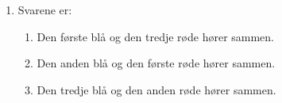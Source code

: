 \begin{enumerate}
	
	\item \label{it:diff11ans} Svarene er:
		\begin{enumerate}
		\item Den første blå og den tredje røde hører sammen.
		\item Den anden blå og den første røde hører sammen.
		\item Den tredje blå og den anden røde hører sammen.
	\end{enumerate}
%		
%

\end{enumerate}
